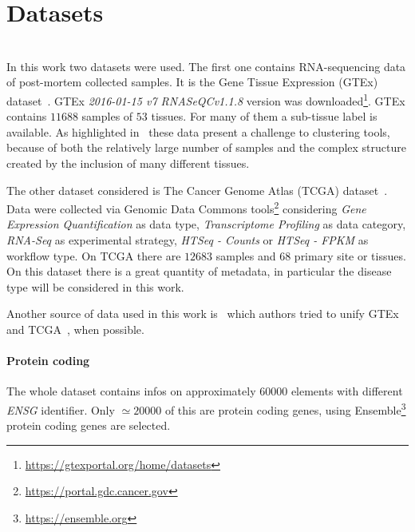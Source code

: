 \section{Datasets}\mbox{}\\
In this work two datasets were used. The first one contains RNA-sequencing data of post-mortem collected samples. It is the Gene Tissue Expression (GTEx) dataset~\cite{carithers2015novel}. GTEx \textit{2016-01-15 v7 RNASeQCv1.1.8} version was downloaded\footnote{\url{https://gtexportal.org/home/datasets}}.
GTEx contains $11688$ samples of $53$ tissues. For many of them a sub-tissue label is available. As highlighted in~\cite{dey2017visualizing} these data present a challenge to clustering tools, because of both the relatively large number of samples and the complex structure created by the inclusion of many different tissues.

The other dataset considered is The Cancer Genome Atlas (TCGA) dataset~\cite{grossman2016toward}. Data were collected via Genomic Data Commons tools\footnote{\url{https://portal.gdc.cancer.gov}} considering \textit{Gene Expression Quantification} as data type, \textit{Transcriptome Profiling} as data category, \textit{RNA-Seq} as experimental strategy, \textit{HTSeq - Counts} or \textit{HTSeq - FPKM} as workflow type. On TCGA there are $12683$ samples and $68$ primary site or tissues. On this dataset there is a great quantity of metadata, in particular the disease type will be considered in this work.

Another source of data used in this work is~\cite{Wang2017} which authors tried to unify GTEx and TCGA~\cite{Betel2018}, when possible.

\paragraph{Protein coding}
The whole dataset contains infos on approximately $60000$ elements with different \textit{ENSG} identifier. Only $\simeq 20000$ of this are protein coding genes, using Ensemble\footnote{\url{https://ensemble.org}} protein coding genes are selected.
